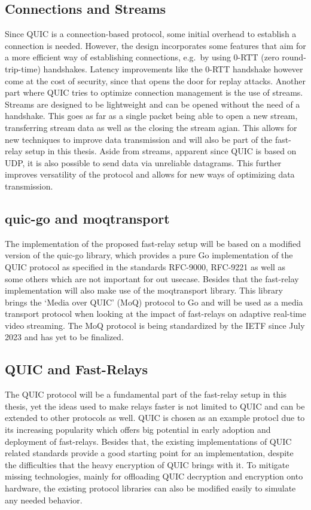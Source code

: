 \subsection{Connections and Streams}
Since QUIC is a connection-based protocol, some initial overhead to establish a connection is needed.
However, the design incorporates some features that aim for a more efficient way of establishing 
connections, e.g.\ by using 0-RTT (zero round-trip-time) handshakes.
Latency improvements like the 0-RTT handshake however come at the cost of security, since that opens 
the door for replay attacks.
Another part where QUIC tries to optimize connection management is the use of streams.
Streams are designed to be lightweight and can be opened without the need of a handshake.
This goes as far as a single packet being able to open a new stream, transferring stream data
as well as the closing the stream agian.
This allows for new techniques to improve data transmission and will also be part of the fast-relay 
setup in this thesis.
Aside from streams, apparent since QUIC is based on UDP, it is also possible to send data via
unreliable datagrams.
This further improves versatility of the protocol and allows for new ways of optimizing data transmission.

\subsection{quic-go and moqtransport}
The implementation of the proposed fast-relay setup will be based on a modified version of the quic-go library, 
which provides a pure Go implementation of the QUIC protocol as specified in the standards RFC-9000, RFC-9221 
as well as some others which are not important for out usecase. 
Besides that the fast-relay implementation will also make use of the moqtransport library.
This library brings the `Media over QUIC' (MoQ) protocol to Go and will be used as a media transport protocol 
when looking at the impact of fast-relays on adaptive real-time video streaming.
The MoQ protocol is being standardized by the IETF since July 2023 and has yet to be finalized. 

\subsection{QUIC and Fast-Relays}
The QUIC protocol will be a fundamental part of the fast-relay setup in this thesis, yet the ideas used 
to make relays faster is not limited to QUIC and can be extended to other protocols as well.
QUIC is chosen as an example protocl due to its increasing popularity which offers big potential 
in early adoption and deployment of fast-relays.
Besides that, the existing implementations of QUIC related standards provide a good starting point for
an implementation, despite the difficulties that the heavy encryption of QUIC brings with it.
To mitigate missing technologies, mainly for offloading QUIC decryption and encryption onto hardware,
the existing protocol libraries can also be modified easily to simulate any needed behavior.
